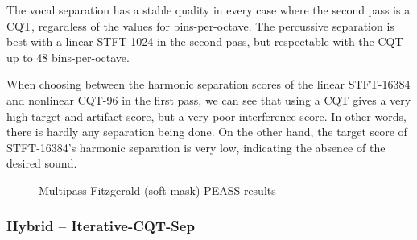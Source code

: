 \documentclass[letter,12pt]{article}
\begin{document}
The vocal separation has a stable quality in every case where the second pass is a CQT, regardless of the values for bins-per-octave. The percussive separation is best with a linear STFT-1024 in the second pass, but respectable with the CQT up to 48 bins-per-octave.

When choosing between the harmonic separation scores of the linear STFT-16384 and nonlinear CQT-96 in the first pass, we can see that using a CQT gives a very high target and artifact score, but a very poor interference score. In other words, there is hardly any separation being done. On the other hand, the target score of STFT-16384's harmonic separation is very low, indicating the absence of the desired sound.

\begin{figure}[ht]
	\centering
	\vspace{-1.25em}
	\caption{Multipass Fitzgerald (soft mask) PEASS results}
	\label{fig:vocalround1soft}
\end{figure}

\subsubsection{Hybrid -- Iterative-CQT-Sep}
\end{document}
